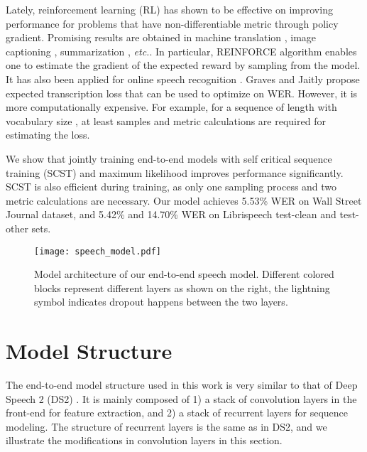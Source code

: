 \documentclass{article}
\newcommand{\etc}{\emph{etc.}\xspace}
\begin{document}
Lately, reinforcement learning (RL) has shown to be effective on improving performance for problems that have non-differentiable metric through policy gradient. Promising results are obtained in machine translation \cite{ranzato2015sequence, bahdanau2016actor}, image captioning \cite{ranzato2015sequence, rennie2016self}, summarization \cite{ranzato2015sequence,paulus2017deep}, \etc.  In particular, REINFORCE algorithm \cite{williams1992simple} enables one to estimate the gradient of the expected reward by sampling from the model. It has also been applied for online speech recognition \cite{luo2017learning}. Graves and Jaitly \cite{graves2014towards} propose expected transcription loss that can be used to optimize on WER. However, it is more computationally expensive. For example, for a sequence of length  with vocabulary size , at least  samples and  metric calculations are required for estimating the loss.


We show that jointly training end-to-end models with self critical sequence training (SCST) \cite{rennie2016self} and maximum likelihood improves performance significantly. 
SCST is also efficient during training, as only one sampling process and two metric calculations are necessary. Our model achieves 5.53\% WER on Wall Street Journal dataset, and 5.42\% and 14.70\% WER on Librispeech test-clean and test-other sets.


\begin{figure}[tbhp!]
\centering
\texttt{[image: speech\_model.pdf]}
\caption{Model architecture of our end-to-end speech model. Different colored blocks represent different layers as shown on the right, the lightning symbol indicates dropout happens between the two layers.}
\label{fig:model_structure}
\end{figure}

\section{Model Structure}
The end-to-end model structure used in this work is very similar to that of Deep Speech 2 (DS2) \cite{amodei2016deep}. It is mainly composed of 1) a stack of convolution layers in the front-end for feature extraction,  and 2) a stack of recurrent layers for sequence modeling. The structure of recurrent layers is the same as in DS2, and we illustrate the modifications in convolution layers in this section. 
\end{document}
